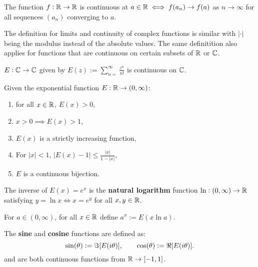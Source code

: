 \documentclass[../Year1.tex]{subfiles}
\begin{document}
\begin{definition}
    The function $f:\mathbb{R}\rightarrow\mathbb{R}$ is continuous at $a\in\mathbb{R} \iff f(a_n)\rightarrow f(a)$ as $n\rightarrow\infty$ for all sequences $(a_n)$ converging to $a$.
\end{definition}

\begin{remark}
    The definition for limits and continuity of complex functions is similar with $|\cdot|$ being the modulus instead of the absolute values. The same definitition also applies for functions that are continuous on certain subsets of $\mathbb{R}$ or $\mathbb{C}$.
\end{remark}

\begin{theorem}
    $E:\mathbb{C}\rightarrow\mathbb{C}$ given by $\displaystyle E(z):=\sum_{n=}^\infty \frac{z^n}{n!}$ is continuous on $\mathbb{C}$.
\end{theorem}

\begin{theorem}
    Given the exponential function $E:\mathbb{R}\rightarrow(0,\infty)$: \begin{enumerate}
        \item for all $x\in\mathbb{R}$, $E(x)>0$,
        \item $x>0\implies E(x)>1$,
        \item $E(x)$ is a strictly increasing function,
        \item For $|x|<1$, $\displaystyle |E(x)-1|\leq \frac{|x|}{1-|x|}$,
        \item $E$ is a continuous bijection.
    \end{enumerate}
\end{theorem}

\begin{theorem}
    The inverse of $E(x)=e^x$ is the \textbf{natural logarithm} function $\ln:(0,\infty)\rightarrow\mathbb{R}$ satisfying $y=\ln x \iff x = e^y$ for all $x,y\in\mathbb{R}$.
\end{theorem}

\begin{definition}
    For $a\in(0,\infty)$, for all $x\in\mathbb{R}$ define $a^x:=E(x\ln a)$.
\end{definition}

\begin{definition}
    The \textbf{sine} and \textbf{cosine} functions are defined as: \[
    \sin(\theta):=\Im[E(i\theta)] \textcolor{black}{,} \qquad \cos(\theta):=\Re[E(i\theta)]
    \textcolor{black}{.}
    \] and are both continuous functions from $\mathbb{R}\rightarrow[-1,1]$.
\end{definition}
\end{document}

